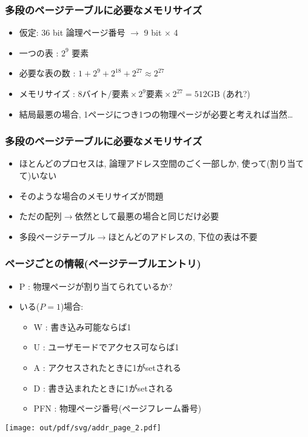 \documentclass[12pt,dvipdfmx]{beamer}
\begin{document}
\begin{frame}
  \frametitle{多段のページテーブルに必要なメモリサイズ}
  \begin{itemize}
  \item 仮定: 36 bit 論理ページ番号 $\rightarrow$ 9 bit $\times$ 4 
  \item 一つの表 : $2^9$ 要素
  \item 必要な表の数 : $1 + 2^9 + 2^{18} + 2^{27} \approx 2^{27}$
  \item メモリサイズ : $8 \mbox{バイト/要素} \times 2^9 \mbox{要素} \times 2^{27} = 512\mbox{GB}$ (あれ?)
  \item 結局最悪の場合, 1ページにつき1つの物理ページが必要と考えれば当然\ldots
  \end{itemize}
\end{frame}

\begin{frame}
  \frametitle{多段のページテーブルに必要なメモリサイズ}
  \begin{itemize}
  \item ほとんどのプロセスは, 論理アドレス空間のごく一部しか,
    使って(割り当てて)いない
  \item そのような場合のメモリサイズが問題
  \item ただの配列$\rightarrow$依然として最悪の場合と同じだけ必要
  \item 多段ページテーブル$\rightarrow$ほとんどのアドレスの, 下位の表は不要
  \end{itemize}
\end{frame}

\begin{frame}
  \frametitle{ページごとの情報(ページテーブルエントリ)}
  \begin{itemize}
  \item P : 物理ページが割り当てられているか?
  \item いる($P = 1$)場合:
    \begin{itemize}
    \item W : 書き込み可能ならば1
    \item U : ユーザモードでアクセス可ならば1
    \item A : アクセスされたときに1がsetされる
    \item D : 書き込まれたときに1がsetされる
    \item PFN : 物理ページ番号(ページフレーム番号)
    \end{itemize}
  \end{itemize}
  
  \begin{center}
  \texttt{[image: out/pdf/svg/addr\_page\_2.pdf]}
  \end{center}
\end{frame}
\end{document}
